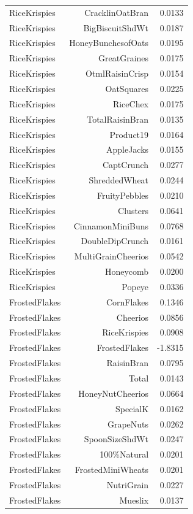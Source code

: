 \begin{longtable}{@{}lrr@{}}
RiceKrispies & CracklinOatBran & 0.0133 \\
RiceKrispies & BigBiscuitShdWt & 0.0187 \\
RiceKrispies & HoneyBunchesofOats & 0.0195 \\
RiceKrispies & GreatGraines & 0.0175 \\
RiceKrispies & OtmlRaisinCrisp & 0.0154 \\
RiceKrispies & OatSquares & 0.0225 \\
RiceKrispies & RiceChex & 0.0175 \\
RiceKrispies & TotalRaisinBran & 0.0135 \\
RiceKrispies & Product19 & 0.0164 \\
RiceKrispies & AppleJacks & 0.0155 \\
RiceKrispies & CaptCrunch & 0.0277 \\
RiceKrispies & ShreddedWheat & 0.0244 \\
RiceKrispies & FruityPebbles & 0.0210 \\
RiceKrispies & Clusters & 0.0641 \\
RiceKrispies & CinnamonMiniBuns & 0.0768 \\
RiceKrispies & DoubleDipCrunch & 0.0161 \\
RiceKrispies & MultiGrainCheerios & 0.0542 \\
RiceKrispies & Honeycomb & 0.0200 \\
RiceKrispies & Popeye & 0.0336 \\
FrostedFlakes & CornFlakes & 0.1346 \\
FrostedFlakes & Cheerios & 0.0856 \\
FrostedFlakes & RiceKrispies & 0.0908 \\
FrostedFlakes & FrostedFlakes & -1.8315 \\
FrostedFlakes & RaisinBran & 0.0795 \\
FrostedFlakes & Total & 0.0143 \\
FrostedFlakes & HoneyNutCheerios & 0.0664 \\
FrostedFlakes & SpecialK & 0.0162 \\
FrostedFlakes & GrapeNuts & 0.0262 \\
FrostedFlakes & SpoonSizeShdWt & 0.0247 \\
FrostedFlakes & 100\%Natural & 0.0201 \\
FrostedFlakes & FrostedMiniWheats & 0.0201 \\
FrostedFlakes & NutriGrain & 0.0227 \\
FrostedFlakes & Mueslix & 0.0137 \\

\end{longtable}
